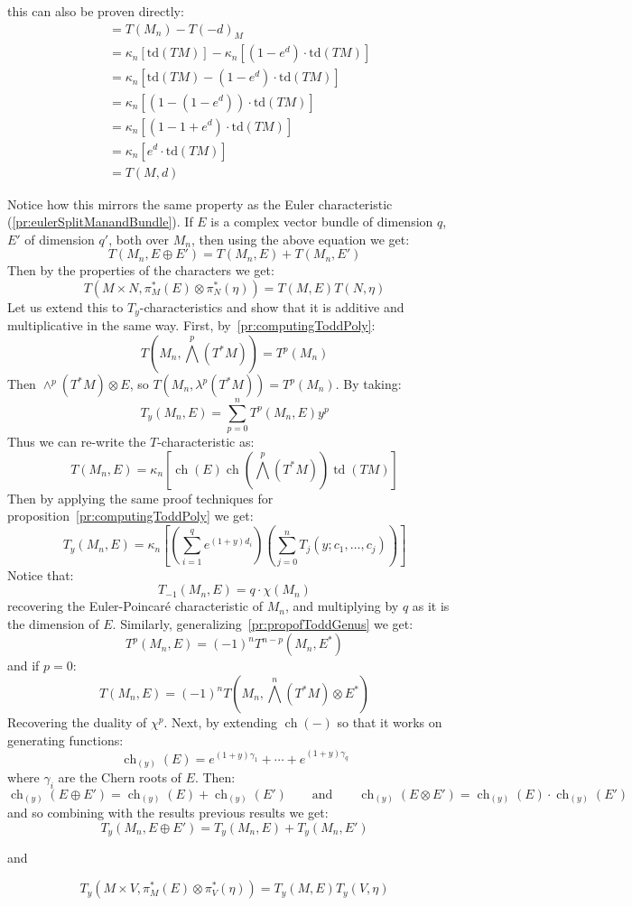 \documentclass{book}
\newenvironment{Proof}[1][]
  {\begin{ProofTcb}[#1]}
  {\end{ProofTcb}}
\newcommand{\ch}{{\operatorname{ch}}}
\newcommand{\td}{{\operatorname{td}}}
\renewcommand{\ch}{{\operatorname{ch}}}
\begin{document}
\begin{Proof}
  this can also be proven directly:
  \begin{align*} &= T(M_n) - T(-d)_M \\ &= \kappa_n[\text{td}(TM)] - \kappa_n[(1 - e^d) \cdot \text{td}(TM)] \\
  &= \kappa_n[\text{td}(TM) - (1 - e^d) \cdot \text{td}(TM)] \\ &= \kappa_n[\left(1 - (1 - e^d)\right) \cdot
  \text{td}(TM)] \\ &= \kappa_n[\left(1 - 1 + e^d\right) \cdot \text{td}(TM)] \\ &= \kappa_n[e^d \cdot
  \text{td}(TM)]\\
  &= T(M, d)
  \end{align*}
\end{Proof}
Notice how this mirrors the same property as the Euler characteristic (\cref{pr:eulerSplitManandBundle}). If $E$ is a complex
vector bundle of dimension $q$, $E'$ of dimension $q'$, both over $M_n$, then using the
above equation we get:
\[
  T(M_n, E\oplus E') = T(M_n, E) + T(M_n, E')
\]
Then by the properties of the characters we get:
\[
  T(M\times N, \pi_M^*(E)\otimes \pi_N^*(\eta)) = T(M,E)T(N, \eta)
\]
Let us extend this to $T_y$-characteristics and show that it is additive and multiplicative in the same way.
First, by~\cref{pr:computingToddPoly}:
\[
  T \left(M_n, \bigwedge^p(T^*M)\right) = T^p(M_n)
\]
Then $\wedge^p(T^*M)\otimes E$, so $T(M_n, \lambda^p(T^*M)) = T^p(M_n)$. By taking:
\[
  T_y(M_n, E) = \sum_{p=0}^n T^p(M_n, E)y^p
\]
Thus we can re-write the $T$-characteristic as:
 \[
   T(M_n,E) = \kappa_n \left[\ch(E)\ch\left(\bigwedge^p(T^*M)\right) \td(TM)\right]
 \]
 Then by applying the same proof techniques for proposition~\cref{pr:computingToddPoly} we get:
\[
  T_y(M_n, E) = \kappa_n \left[\left(\sum_{i=1}^q e^{(1+y)d_i}\right)\left(\sum_{j=0}^n T_j(y;c_1,\ldots,c_j)\right)\right]
\]
Notice that:
\[
  T_{-1}(M_n, E) = q\cdot\chi(M_n)
\]
recovering the Euler-Poincar\'e characteristic of $M_n$, and multiplying by $q$ as it is the dimension of $E$.
Similarly, generalizing~\cref{pr:propofToddGenus} we get:
\[
  T^p(M_n, E) = (-1)^n T^{n-p}(M_n, E^*)
\]
and if $p  =0$:
\[
  T(M_n, E) = (-1)^n T\left(M_n, \bigwedge^n(T^*M)\otimes E^*\right)
\]
Recovering the duality of $\chi^p$. Next, by extending $\ch(-)$ so that it works on generating functions:
  \[
    \ch_{(y)}(E) = e^{(1+y)\gamma_1} + \cdots + e^{(1+y)\gamma_q}
  \]
where $\gamma_i$ are the Chern roots of $E$. Then:
\[
  \ch_{(y)}(E\oplus E') = \ch_{(y)}(E) + \ch_{(y)}(E') \qquad \text{and} \qquad \ch_{(y)}(E\otimes E')
  = \ch_{(y)}(E)\cdot \ch_{(y)}(E')
\]
and so combining with the results previous results we get:
\[
  T_y(M_n, E\oplus E') = T_y(M_n, E) + T_y(M_n, E')
\]
\begin{center}
  and
\end{center}
\[
  T_y(M\times V, \pi_M^*(E)\otimes \pi_V^*(\eta)) = T_y(M, E)T_y(V, \eta)
\]
\end{document}
